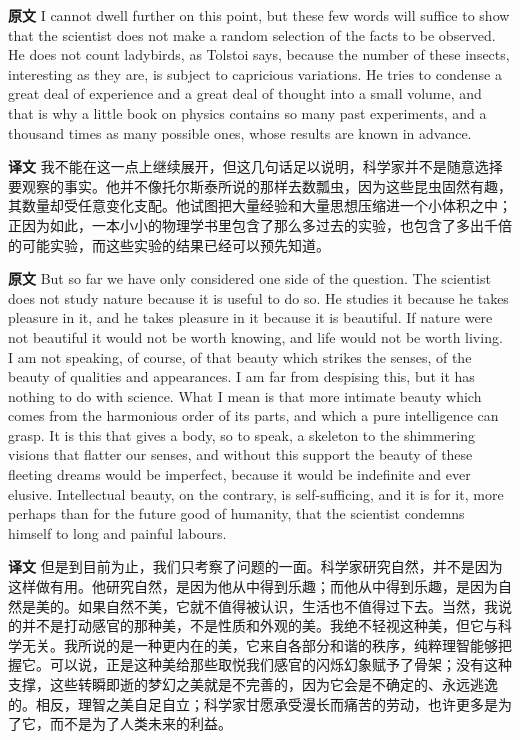 \documentclass[UTF8,zihao=-4]{ctexart}
\newcommand{\BodyFont}{\fontsize{10.5pt}{15.5pt}\selectfont}
\newcommand{\origlabel}{\textbf{原文}\quad}
\newcommand{\translabel}{\textbf{译文}\quad}
\newenvironment{enblock}{\par\noindent\begingroup\BodyFont\origlabel}{\par\endgroup}
\newenvironment{zhblock}{\par\noindent\begingroup\BodyFont\translabel}{\par\endgroup\vspace{0.35em}}
\begin{document}
\begin{enblock}
I cannot dwell further on this point, but these few words will suffice to show that the scientist does not make a random selection of the facts to be observed. He does not count ladybirds, as Tolstoi says, because the number of these insects, interesting as they are, is subject to capricious variations. He tries to condense a great deal of experience and a great deal of thought into a small volume, and that is why a little book on physics contains so many past experiments, and a thousand times as many possible ones, whose results are known in advance.
\end{enblock}
\begin{zhblock}
我不能在这一点上继续展开，但这几句话足以说明，科学家并不是随意选择要观察的事实。他并不像托尔斯泰所说的那样去数瓢虫，因为这些昆虫固然有趣，其数量却受任意变化支配。他试图把大量经验和大量思想压缩进一个小体积之中；正因为如此，一本小小的物理学书里包含了那么多过去的实验，也包含了多出千倍的可能实验，而这些实验的结果已经可以预先知道。\end{zhblock}

\begin{enblock}
But so far we have only considered one side of the question. The scientist does not study nature because it is useful to do so. He studies it because he takes pleasure in it, and he takes pleasure in it because it is beautiful. If nature were not beautiful it would not be worth knowing, and life would not be worth living. I am not speaking, of course, of that beauty which strikes the senses, of the beauty of qualities and appearances. I am far from despising this, but it has nothing to do with science. What I mean is that more intimate beauty which comes from the harmonious order of its parts, and which a pure intelligence can grasp. It is this that gives a body, so to speak, a skeleton to the shimmering visions that flatter our senses, and without this support the beauty of these fleeting dreams would be imperfect, because it would be indefinite and ever elusive. Intellectual beauty, on the contrary, is self-sufficing, and it is for it, more perhaps than for the future good of humanity, that the scientist condemns himself to long and painful labours.
\end{enblock}
\begin{zhblock}
但是到目前为止，我们只考察了问题的一面。科学家研究自然，并不是因为这样做有用。他研究自然，是因为他从中得到乐趣；而他从中得到乐趣，是因为自然是美的。如果自然不美，它就不值得被认识，生活也不值得过下去。当然，我说的并不是打动感官的那种美，不是性质和外观的美。我绝不轻视这种美，但它与科学无关。我所说的是一种更内在的美，它来自各部分和谐的秩序，纯粹理智能够把握它。可以说，正是这种美给那些取悦我们感官的闪烁幻象赋予了骨架；没有这种支撑，这些转瞬即逝的梦幻之美就是不完善的，因为它会是不确定的、永远逃逸的。相反，理智之美自足自立；科学家甘愿承受漫长而痛苦的劳动，也许更多是为了它，而不是为了人类未来的利益。\end{zhblock}
\end{document}
